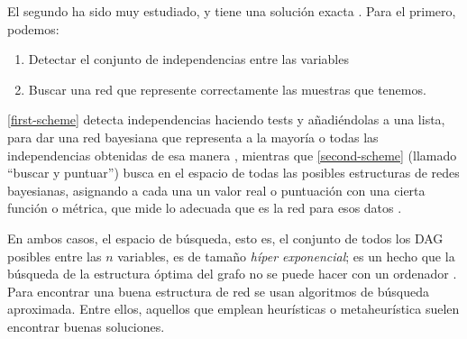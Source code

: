 El segundo ha sido muy estudiado, y tiene una solución exacta \cite{neapolitan}. Para el primero, podemos:
\begin{enumerate}
    \item \label{first-scheme} Detectar el conjunto de independencias entre las variables
    \item \label{second-scheme} Buscar una red que represente correctamente las muestras que tenemos.
\end{enumerate}
    

\ref{first-scheme} detecta independencias haciendo tests y añadiéndolas a una lista, para dar una red 
bayesiana que representa a la mayoría o todas las independencias obtenidas de esa manera \cite{learning-algorithms-BN-comparison}, 
mientras que \ref{second-scheme} (llamado ``buscar y puntuar'') busca en el espacio de todas las posibles estructuras 
de redes bayesianas, asignando a cada una un valor real o puntuación con una cierta función o métrica, que mide lo 
adecuada que es la red para esos datos \cite{more-algorithms}.

En ambos casos, el espacio de búsqueda, esto es, el conjunto de todos los DAG posibles entre las $n$ variables, 
es de tamaño {\em híper exponencial}; es un hecho que la búsqueda de la estructura óptima del grafo no se puede 
hacer con un ordenador \cite{Chickering}. Para encontrar una buena estructura de red se usan algoritmos de búsqueda 
aproximada. Entre ellos, aquellos que emplean heurísticas o metaheurística suelen encontrar buenas soluciones. 